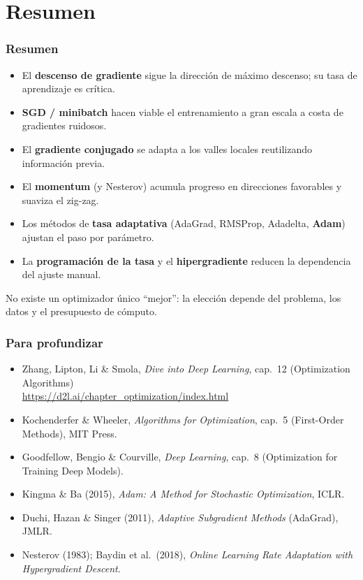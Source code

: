 \documentclass[aspectratio=169, 10pt]{beamer}
\begin{document}
\section{Resumen}

\begin{frame}
\frametitle{Resumen}
\begin{itemize}
	\item El \textbf{descenso de gradiente} sigue la direcci\'on de m\'aximo descenso; su tasa de aprendizaje es cr\'itica.
	\item \textbf{SGD / minibatch} hacen viable el entrenamiento a gran escala a costa de gradientes ruidosos.
	\item El \textbf{gradiente conjugado} se adapta a los valles locales reutilizando informaci\'on previa.
	\item El \textbf{momentum} (y Nesterov) acumula progreso en direcciones favorables y suaviza el zig-zag.
	\item Los m\'etodos de \textbf{tasa adaptativa} (AdaGrad, RMSProp, Adadelta, \textbf{Adam}) ajustan el paso por par\'ametro.
	\item La \textbf{programaci\'on de la tasa} y el \textbf{hipergradiente} reducen la dependencia del ajuste manual.
\end{itemize}
\vspace{0.4em}
\begin{block}{}
No existe un optimizador \'unico ``mejor'': la elecci\'on depende del problema, los datos y el presupuesto de c\'omputo.
\end{block}
\end{frame}

\begin{frame}
\frametitle{Para profundizar}
\begin{itemize}
	\item Zhang, Lipton, Li \& Smola, \emph{Dive into Deep Learning}, cap.~12 (Optimization Algorithms)\\ \url{https://d2l.ai/chapter_optimization/index.html}
	\item Kochenderfer \& Wheeler, \emph{Algorithms for Optimization}, cap.~5 (First-Order Methods), MIT Press.
	\item Goodfellow, Bengio \& Courville, \emph{Deep Learning}, cap.~8 (Optimization for Training Deep Models).
	\item Kingma \& Ba (2015), \emph{Adam: A Method for Stochastic Optimization}, ICLR.
	\item Duchi, Hazan \& Singer (2011), \emph{Adaptive Subgradient Methods} (AdaGrad), JMLR.
	\item Nesterov (1983); Baydin et al.\ (2018), \emph{Online Learning Rate Adaptation with Hypergradient Descent}.
\end{itemize}
\end{frame}
\end{document}
